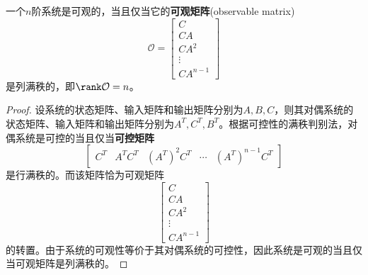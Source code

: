 \begin{theorem}[可观性的满秩判别法]
    一个$n$阶系统是可观的，当且仅当它的\textbf{可观矩阵}(observable matrix)
    \begin{equation}
        \mathcal{O}=\begin{bmatrix}
        C\\
        CA\\
        CA^2\\
        \vdots\\
        CA^{n-1}
        \end{bmatrix}
    \end{equation}
    是列满秩的，即$\rank\mathcal{O}=n$。
\end{theorem}
\begin{proof}
    设系统的状态矩阵、输入矩阵和输出矩阵分别为$A,B,C$，则其对偶系统的状态矩阵、输入矩阵和输出矩阵分别为$A^T,C^T,B^T$。根据可控性的满秩判别法，对偶系统是可控的当且仅当\textbf{可控矩阵}
    \begin{equation}
        \begin{bmatrix}
        C^T & A^TC^T & (A^T)^2C^T & \cdots & (A^T)^{n-1}C^T
        \end{bmatrix}
    \end{equation}
    是行满秩的。而该矩阵恰为可观矩阵
    \begin{equation}
        \begin{bmatrix}
        C\\
        CA\\
        CA^2\\
        \vdots\\
        CA^{n-1}
        \end{bmatrix}
    \end{equation}
    的转置。由于系统的可观性等价于其对偶系统的可控性，因此系统是可观的当且仅当可观矩阵是列满秩的。
\end{proof}
